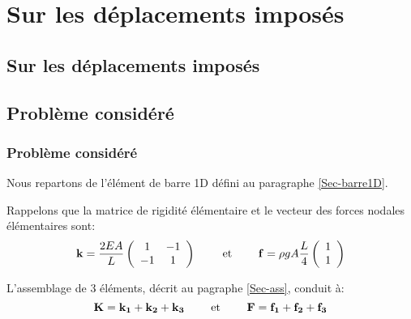 \ifVersionAvecExemplesSepares
   \chapter{Sur les déplacements imposés}\label{Ch-DispLag}%
\else
   \section{Sur les déplacements imposés}\label{Ch-DispLag}%
\fi

\medskip
\ifVersionAvecExemplesSepares
   \section{Problème considéré}
\else
   \subsection{Problème considéré}
\fi

Nous repartons de l'élément de barre 1D défini au paragraphe \ref{Sec-barre1D}.

Rappelons que la matrice de rigidité élémentaire et le vecteur des forces nodales élémentaires sont:
\begin{equation} \MM{k} = \frac{2EA}L \MMM{ \begin{array}{cc} 1 & -1\\ -1& 1 \end{array}} %
\qquad \text{ et } \qquad
\VV{f} = \rho g A \frac{L}4 \VVV{ \begin{array}{c} 1 \\1 \end{array}} \end{equation}

\medskip
L'assemblage de 3 éléments, décrit au pagraphe \ref{Sec-ass}, conduit à:
\begin{equation} \mathbf{K}=\mathbf{k_1}+\mathbf{k_2}+\mathbf{k_3} \qquad \text{ et } \qquad \mathbf{F}=\mathbf{f_1}+\mathbf{f_2}+\mathbf{f_3} \end{equation}

